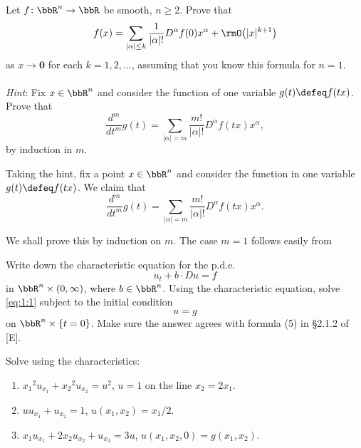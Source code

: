 \begin{problem}
  Let \(f\colon\bbR^n\to\bbR\) be smooth, \(n\geq 2\). Prove that
  \[
    f(x)=\sum_{|\alpha|\leq k}
    \frac{1}{|\alpha|!}D^\alpha f(0)x^\alpha+\rmO\bigl(|x|^{k+1}\bigr)
  \]
  as \(x\to\mathbf{0}\) for each \(k=1,2,\dotsc\), assuming that you know this
  formula for \(n=1\).
  \\\\
  \emph{Hint}: Fix \(x\in\bbR^n\) and consider the function of one variable
  \(g(t)\defeq f(tx)\). Prove that
  \[
    \frac{d^m}{d t^m}g(t)
    =\sum_{|\alpha|=m}\frac{m!}{|\alpha|!} D^\alpha f(tx)x^\alpha,
  \]
  by induction in \(m\).
\end{problem}
\begin{solution}
  Taking the hint, fix a point \(x\in\bbR^n\) and consider the function in
  one variable \(g(t)\defeq f(tx)\). We claim that
  \[
    \frac{d^m}{d t^m}g(t)
    =\sum_{|\alpha|=m}\frac{m!}{|\alpha|!} D^\alpha f(tx)x^\alpha.
  \]
  \begin{subproof}
    We shall prove this by induction on \(m\). The case \(m=1\) follows
    easily from
  \end{subproof}
\end{solution}
\newpage

\begin{problem}
  Write down the characteristic equation for the p.d.e.\@
  \[
    \label{eq:1:1}
    \tag{\(*\)}
    u_t+b\cdot Du=f
  \]
  in \(\bbR^n\times(0,\infty)\), where \(b\in\bbR^n\). Using the
  characteristic equation, solve \eqref{eq:1:1} subject to the initial
  condition
  \[
    u=g
  \]
  on \(\bbR^n\times\{t=0\}\). Make sure the answer agrees with formula (5)
  in \S 2.1.2 of [E].
\end{problem}
\begin{solution}

\end{solution}
\newpage

\begin{problem}
  Solve using the characteristics:
  \begin{enumerate}[label=(\alph*)]
  \item \({x_1}^{\!2}u_{x_1}+{x_2}^{\!2}u_{x_2}=u^2\), \(u=1\) on the line
    \(x_2=2x_1\).
  \item \(uu_{x_1}+u_{x_2}=1\), \(u(x_1,x_2)=x_1/2\).
  \item \(x_1u_{x_1}+2x_2u_{x_2}+u_{x_3}=3u\),
    \(u(x_1,x_2,0)=g(x_1,x_2)\).
  \end{enumerate}
\end{problem}
\begin{solution}

\end{solution}
\newpage

